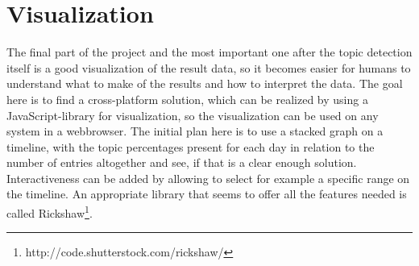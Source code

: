 \section{Visualization}\label{sec:Visualization}
The final part of the project and the most important one after the topic detection itself is a good visualization of the result data, so it becomes easier for humans to understand what to make of the results and how to interpret the data. The goal here is to find a cross-platform solution, which can be realized by using a JavaScript-library for visualization, so the visualization can be used on any system in a webbrowser. The initial plan here is to use a stacked graph on a timeline, with the topic percentages present for each day in relation to the number of entries altogether and see, if that is a clear enough solution. Interactiveness can be added by allowing to select for example a specific range on the timeline. An appropriate library that seems to offer all the features needed is called Rickshaw\footnote{http://code.shutterstock.com/rickshaw/}. 
